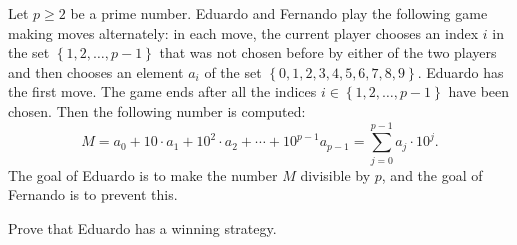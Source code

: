 Let $p\geq2$ be a prime number. Eduardo and Fernando play the following game making moves alternately: in each move, the current player chooses an index $i$ in the set $\left\{1,2,\ldots,p-1\right\}$ that was not chosen before by either of the two players and then chooses an element $a_i$ of the set $\left\{0,1,2,3,4,5,6,7,8,9\right\}$. Eduardo has the first move. The game ends after all the indices $i\in\left\{1,2,\ldots,p-1\right\}$ have been chosen. Then the following number is computed: \[M=a_0+10\cdot a_1+10^2\cdot a_2+\cdots+10^{p-1}a_{p-1}=\displaystyle\sum_{j=0}^{p-1}a_j\cdot10^j.\] The goal of Eduardo is to make the number $M$ divisible by $p$, and the goal of Fernando is to prevent this. 

Prove that Eduardo has a winning strategy.